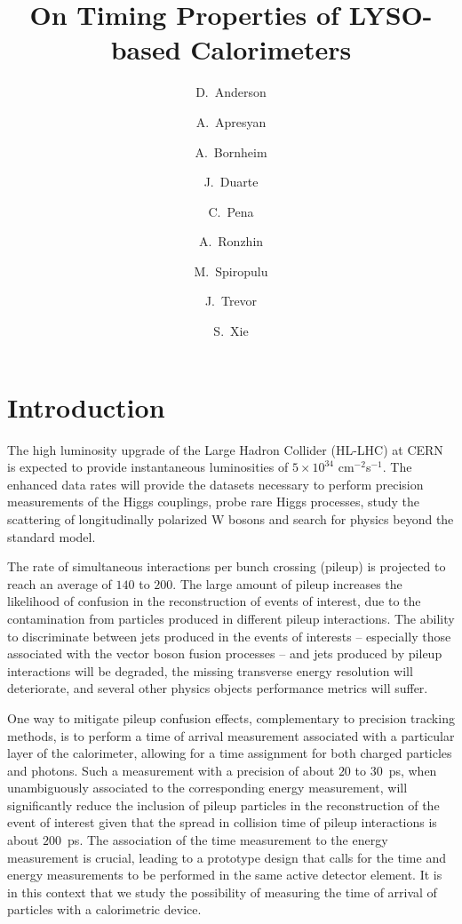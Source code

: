 \documentclass[12pt]{article}
\title{On Timing Properties of LYSO-based Calorimeters}
\author[1]{D.~Anderson}
\author[1]{A.~Apresyan}
\author[1]{A.~Bornheim}
\author[1]{J.~Duarte}
\author[1]{C.~Pena}
\author[2]{A.~Ronzhin}
\author[1]{M.~Spiropulu}
\author[1]{J.~Trevor}
\author[1]{S.~Xie}
\affil[1]{California Institute of Technology, Pasadena, CA, USA}
\affil[2]{Fermi National Accelerator Laboratory, Batavia, IL, USA}
\date{}
\begin{document}
\maketitle
{}



\section{Introduction}

The high luminosity upgrade of the Large Hadron Collider (HL-LHC) at
CERN~\cite{Rossi:1471000} is expected to provide instantaneous luminosities of
$5\times10^{34}$ cm$^{-2}$s$^{-1}$. The enhanced data rates will
provide the datasets necessary to perform precision measurements of the Higgs couplings, 
probe rare Higgs processes, study the scattering of longitudinally polarized W
bosons and search for physics beyond the standard model. 

The  rate of simultaneous interactions per bunch crossing (pileup) is  projected to reach 
an average of $140$ to $200$. The large amount of pileup increases the likelihood of 
confusion in the reconstruction of events of interest, due to the contamination from 
particles produced in different pileup interactions. The ability to discriminate between 
jets produced in the events of interests -- especially those associated with the vector 
boson fusion processes -- and jets produced by pileup interactions will be degraded, 
the missing transverse energy resolution will deteriorate, and several other physics 
objects performance metrics will suffer.

One way to mitigate pileup confusion effects, complementary to precision tracking methods, 
is to perform a time of arrival measurement associated with a particular layer of the calorimeter, 
allowing for a time assignment for both charged particles and photons. Such a measurement with 
a precision of about $20$ to $30$~ps, when unambiguously associated to the corresponding energy
measurement, will significantly reduce the inclusion of pileup particles in  the
reconstruction of the event of interest given that the spread in collision time of
pileup interactions is about $200$~ps. The association of the time measurement to the energy 
measurement is crucial,  leading to  a  prototype  design that calls for the time and energy 
measurements to be performed in the same active detector element. It is in this context that we 
study the possibility of measuring the time of arrival of particles with a calorimetric device.
\end{document}

